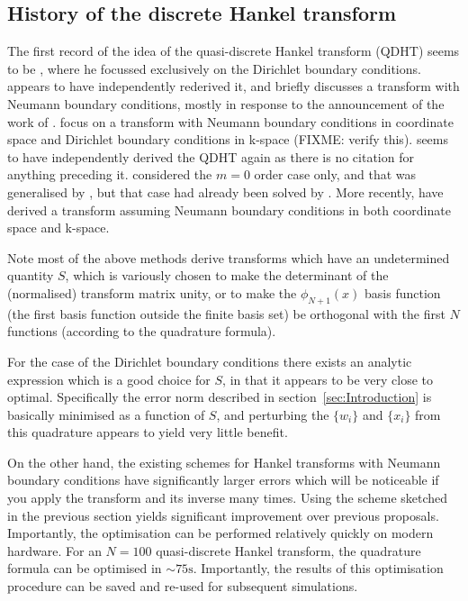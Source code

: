 \documentclass[aip,amsmath,amssymb,reprint,twocolumn]{revtex4-1}
\begin{document}
\subsection{History of the discrete Hankel transform}

The first record of the idea of the quasi-discrete Hankel transform (QDHT) seems to be \citet{Johnson:1987}, where he focussed exclusively on the Dirichlet boundary conditions.  \citet{Lemoine:1994} appears to have independently rederived it, and briefly discusses a transform with Neumann boundary conditions, mostly in response to the announcement of the work of \citet{Stade:1995}.  \citet{Stade:1995} focus on a transform with Neumann boundary conditions in coordinate space and Dirichlet boundary conditions in k-space (FIXME: verify this).  \citet{Yu:1998} seems to have independently derived the QDHT again as there is no citation for anything preceding it.  \citet{Yu:1998} considered the $m=0$ order case only, and that was generalised by \citet{Guizar-Sicairos:2004}, but that case had already been solved by \citet{Johnson:1987,Lemoine:1994}.  More recently, \citet{Kai-Ming:2009} have derived a transform assuming Neumann boundary conditions in both coordinate space and k-space.

Note most of the above methods derive transforms which have an undetermined quantity $S$, which is variously chosen to make the determinant of the (normalised) transform matrix unity, or to make the $\phi_{N+1}(x)$ basis function (the first basis function outside the finite basis set) be orthogonal with the first $N$ functions (according to the quadrature formula).

For the case of the Dirichlet boundary conditions there exists an analytic expression which is a good choice for $S$, in that it appears to be very close to optimal. Specifically the error norm described in section~\ref{sec:Introduction} is basically minimised as a function of $S$, and perturbing the $\{w_i\}$ and $\{x_i\}$ from this quadrature appears to yield very little benefit.

On the other hand, the existing schemes for Hankel transforms with Neumann boundary conditions have significantly larger errors which will be noticeable if you apply the transform and its inverse many times.  Using the scheme sketched in the previous section yields significant improvement over previous proposals.  Importantly, the optimisation can be performed relatively quickly on modern hardware.  For an $N=100$ quasi-discrete Hankel transform, the quadrature formula can be optimised in $\sim 75\text{s}$.  Importantly, the results of this optimisation procedure can be saved and re-used for subsequent simulations.
\end{document}

